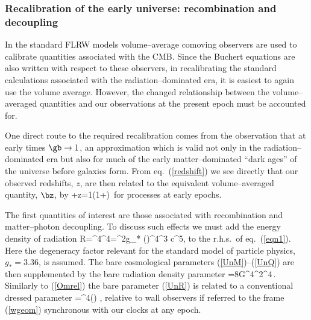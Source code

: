\documentclass[12pt]{iopart}
\begin{document}
\subsubsection{Recalibration of the early universe: recombination and
decoupling\br}\br
In the standard FLRW models volume--average comoving observers are used to
calibrate quantities associated with the CMB. Since the Buchert equations
are also written with respect to these observers, in recalibrating the
standard calculations associated with the radiation--dominated era, it is
easiest to again use the volume average. However, the changed relationship
between the volume--averaged quantities and our observations at the present
epoch must be accounted for.

One direct route to the required recalibration comes from the observation
that at early times $\gb\to1$, an approximation which is valid not only
in the radiation--dominated era but also for much of the early
matter--dominated ``dark ages'' of the universe before galaxies form.
From eq.\ (\ref{redshift}) we see directly that our observed redshifts, $z$,
are then related to the equivalent volume--averaged quantity, $\bz$, by
+z={1\over\gc}(1+\bz)\,
\label{redwall}
\eeq
for processes at early epochs.

The first quantities of interest are those associated with recombination
and matter--photon decoupling. To discuss such effects we must add the energy
density of radiation
\beq
\rhb\Z R={\rhb{}\ab{}^4\over\ab^4}={\pi^2g_*}
{(\kB\bT)^4\over\hbar^3 c^5},
\label{rhv_rad}\eeq
to the r.h.s.\ of eq.\ (\ref{eqn1}). Here the degeneracy factor
relevant for the standard model of particle physics, $g_*=3.36$, is
assumed. The bare cosmological parameters (\ref{UnM})--(\ref{UnQ}) are
then supplemented by the bare radiation density parameter
\beq
\OMR={8\pi G\rhb{}\ab{}^4\bH^2\ab^4}\,.\label{UnR}\\
\eeq
Similarly to (\ref{Omrel}) the bare parameter (\ref{UnR}) is related to
a conventional dressed parameter
\beq
\OmR=\gb^4(\tc)\,\OMR\,,
\label{Omrrel}\eeq
relative to wall observers if referred to the frame (\ref{wgeom}) synchronous
with our clocks at any epoch.
\end{document}
